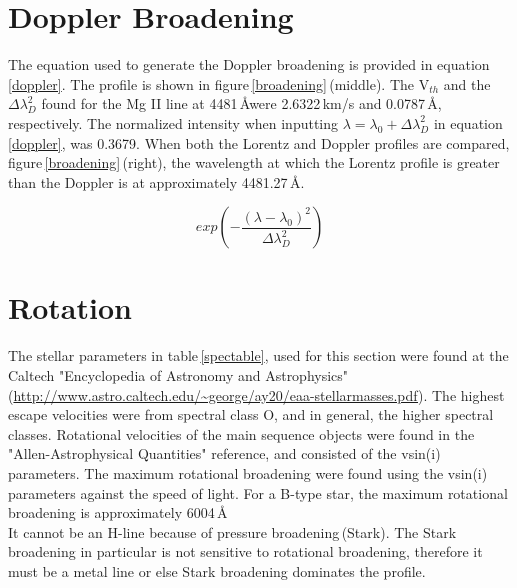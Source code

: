 \documentclass[onecolumn]{aastex6}
\begin{document}
\section{Doppler Broadening}

The equation used to generate the Doppler broadening is provided in equation\,\ref{doppler}. The profile is shown in figure\,\ref{broadening}\,(middle). The V$_{th}$ and the $\Delta\lambda_D^2$ found for the Mg II line at 4481\,\AA were 2.6322\,km/s and 0.0787\,\AA, respectively. The normalized intensity when inputting $\lambda = \lambda_0 + \Delta\lambda_D^2$ in equation\,\ref{doppler}, was 0.3679. When both the Lorentz and Doppler profiles are compared, figure\,\ref{broadening}\,(right), the wavelength at which the Lorentz profile is greater than the Doppler is at approximately 4481.27\,\AA. 

\begin{equation}
exp(-\frac{(\lambda-\lambda_0)^2}{\Delta\lambda_D^2})
\label{doppler}
\end{equation}


\section{Rotation}
The stellar parameters in table\,\ref{spectable}, used for this section were found at the Caltech "Encyclopedia of Astronomy and Astrophysics"\,(\url{http://www.astro.caltech.edu/~george/ay20/eaa-stellarmasses.pdf}). The highest escape velocities were from spectral class O, and in general, the higher spectral classes. Rotational velocities of the main sequence objects were found in the "Allen-Astrophysical Quantities" reference, and consisted of the vsin(i) parameters. The maximum rotational broadening were found using the vsin(i) parameters against the speed of light. For a B-type star, the maximum rotational broadening is approximately 6004\,\AA
\\
\indent It cannot be an H-line because of pressure broadening\,(Stark). The Stark broadening in particular is not sensitive to rotational broadening, therefore it must be a metal line or else Stark broadening dominates the profile.
\end{document}
